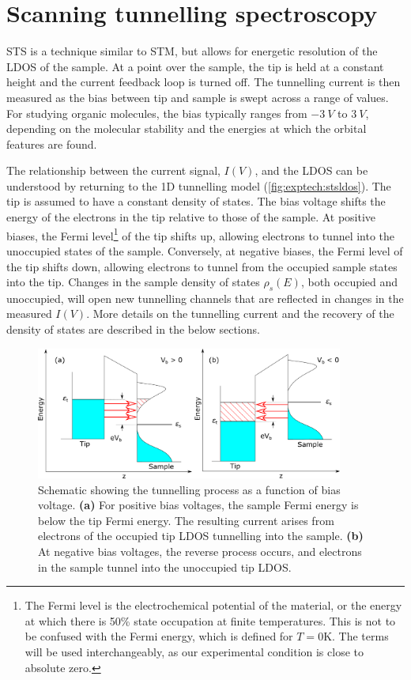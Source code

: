 \section{Scanning tunnelling spectroscopy}
\label{sec:exptech:sts}

\Acf{STS} is a technique similar to \ac{STM}, but allows for energetic resolution of the \ac{LDOS} of the sample. At a point over the sample, the tip is held at a constant height and the current feedback loop is turned off. The tunnelling current is then measured as the bias between tip and sample is swept across a range of values. For studying organic molecules, the bias typically ranges from $\SI{-3}{V}$ to $\SI{3}{V}$, depending on the molecular stability and the energies at which the orbital features are found.

The relationship between the current signal, $I(V)$, and the \ac{LDOS} can be understood by returning to the \ac{1D} tunnelling model (\autoref{fig:exptech:stsldos}). The tip is assumed to have a constant density of states. The bias voltage shifts the energy of the electrons in the tip relative to those of the sample. At positive biases, the Fermi level\footnote{The Fermi level is the electrochemical potential of the material, or the energy at which there is 50\% state occupation at finite temperatures. This is not to be confused with the Fermi energy, which is defined for $T=0$K. The terms will be used interchangeably, as our experimental condition is close to absolute zero.} of the tip shifts up, allowing electrons to tunnel into the unoccupied states of the sample. Conversely, at negative biases, the Fermi level of the tip shifts down, allowing electrons to tunnel from the occupied sample states into the tip. Changes in the sample density of states $\rho_s(E)$, both occupied and unoccupied, will open new tunnelling channels that are reflected in changes in the measured $I(V)$. More details on the tunnelling current and the recovery of the density of states are described in the below sections.

\begin{figure} [h]
    \centering
    \includegraphics[width=0.9\textwidth]{pictures/sts_ldos.png}
    \caption{Schematic showing the tunnelling process as a function of bias voltage. \textbf{(a)} For positive bias voltages, the sample Fermi energy is below the tip Fermi energy. The resulting current arises from electrons of the occupied tip LDOS tunnelling into the sample. \textbf{(b)} At negative bias voltages, the reverse process occurs, and electrons in the sample tunnel into the unoccupied tip LDOS.}
    \label{fig:exptech:stsldos}
\end{figure}

